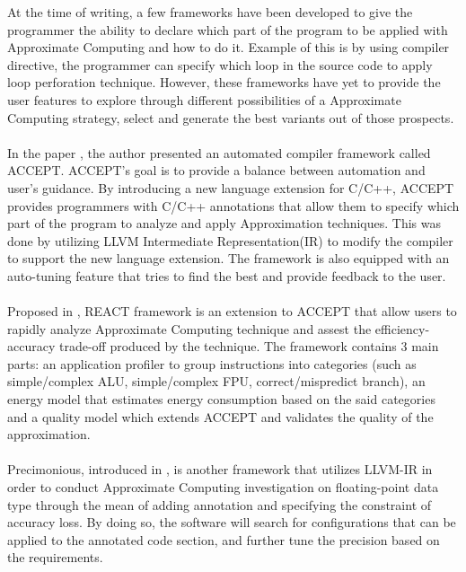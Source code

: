 At the time of writing, a few frameworks have been developed to give the programmer the ability to declare which part of the program to be applied with Approximate Computing and how to do it. Example of this is by using compiler directive, the programmer can specify which loop in the source code to apply loop perforation technique. However, these frameworks have yet to provide the user features to explore through different possibilities of a Approximate Computing strategy, select and generate the best variants out of those prospects. \\
~\\
In the paper \cite{accept}, the author presented an automated compiler framework called ACCEPT. ACCEPT's goal is to provide a balance between automation and user's guidance. By introducing a new language extension for C/C++, ACCEPT provides programmers with C/C++ annotations that allow them to specify which part of the program to analyze and apply Approximation techniques. This was done by utilizing LLVM Intermediate Representation(IR) to modify the compiler to support the new language extension. The framework is also equipped with an auto-tuning feature that tries to find the best and provide feedback to the user. \\
~\\
Proposed in \cite{react}, REACT framework is an extension to ACCEPT that allow users to rapidly analyze Approximate Computing technique and assest the efficiency-accuracy trade-off produced by the technique. The framework contains 3 main parts: an application profiler to group instructions into categories (such as simple/complex ALU, simple/complex FPU, correct/mispredict branch), an energy model that estimates energy consumption based on the said categories and a quality model which extends ACCEPT and validates the quality of the approximation. \\
~\\
Precimonious, introduced in \cite{Precimonious}, is another framework that utilizes LLVM-IR in order to conduct Approximate Computing investigation on floating-point data type through the mean of adding annotation and specifying the constraint of accuracy loss. By doing so, the software will search for configurations that can be applied to the annotated code section, and further tune the precision based on the requirements. \\